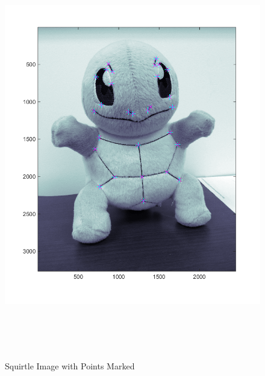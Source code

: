 \documentclass[11pt,psfig]{article}
\begin{document}
\begin{figure}[H]
\centering
\includegraphics[height=7in]{squirtle_prob2Points.png}
\caption{Squirtle Image with Points Marked}
\label{p2a}
\end{figure}
\end{document}
